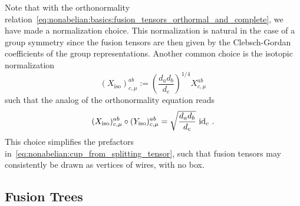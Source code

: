 Note that with the orthonormality relation~\eqref{eq:nonabelian:basics:fusion_tensors_orthormal_and_complete}, we have made a normalization choice.
%
This normalization is natural in the case of a group symmetry since the fusion tensors are then given by the Clebsch-Gordan coefficients of the group representations.
%
Another common choice is the isotopic normalization
\begin{equation}
    (X_\text{iso})^{ab}_{c,\mu} := \left( \frac{d_a d_b}{d_c} \right)^{1/4} X^{ab}_{c,\mu}
\end{equation}
such that the analog of the orthonormality equation reads
\begin{equation}
    (X_\text{iso})^{ab}_{c,\mu} \circ (Y_\text{iso})^{ab}_{c,\mu} = \sqrt{\frac{d_a d_b}{d_c}} ~\mathrm{id}_{c}
    ~.
\end{equation}
This choice simplifies the prefactors in~\eqref{eq:nonabelian:cup_from_splitting_tensor}, such that fusion tensors may consistently be drawn as vertices of wires, with no box.


\subsection{Fusion Trees}
\label{subsec:nonablian:basics:fusion_trees}

